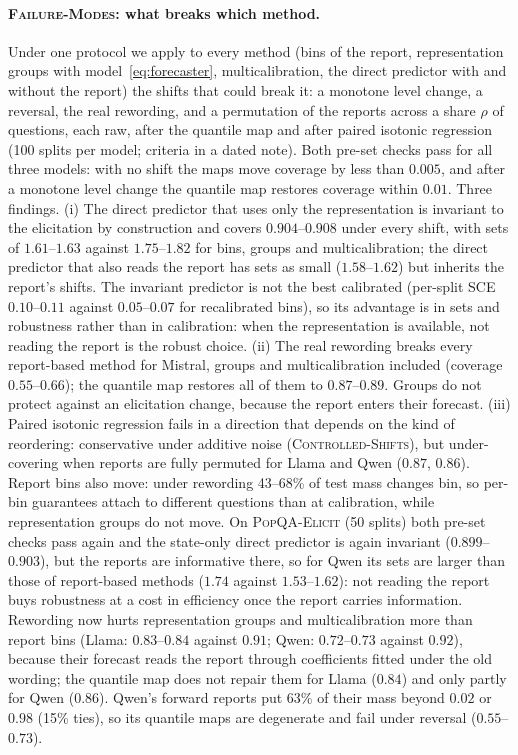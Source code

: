 \documentclass[twoside]{article}
\theoremstyle{definition}
\theoremstyle{remark}
\newcommand{\1}{\mathbf{1}}
\newcommand{\expname}[1]{\textsc{#1}}
\begin{document}
\paragraph{\expname{Failure-Modes}: what breaks which method.} Under one protocol we
apply to every method (bins of the report, representation groups with model~\eqref{eq:forecaster},
multicalibration, the direct predictor with and without the report) the shifts that could break it: a
monotone level change, a reversal, the real rewording, and a permutation of the reports across a share
$\rho$ of questions, each raw, after the quantile map and after paired isotonic regression (100 splits
per model; criteria in a dated note). Both pre-set checks pass for all three models: with no shift the
maps move coverage by less than $0.005$, and after a monotone level change the quantile map restores
coverage within $0.01$. Three findings. (i) The direct predictor that uses only the representation is
invariant to the elicitation by construction and covers $0.904$--$0.908$ under every shift, with sets of
$1.61$--$1.63$ against $1.75$--$1.82$ for bins, groups and multicalibration; the direct predictor that
also reads the report has sets as small ($1.58$--$1.62$) but inherits the report's shifts. The
invariant predictor is not the best calibrated (per-split SCE $0.10$--$0.11$ against $0.05$--$0.07$ for
recalibrated bins), so its advantage is in sets and robustness rather than in calibration: when the
representation is available, not reading the report is the robust choice. (ii) The real rewording
breaks every report-based method for Mistral, groups and multicalibration included (coverage
$0.55$--$0.66$); the quantile map restores all of them to $0.87$--$0.89$. Groups do not protect against
an elicitation change, because the report enters their forecast. (iii) Paired isotonic regression
fails in a direction that depends on the kind of reordering: conservative under additive noise
(\expname{Controlled-Shifts}), but under-covering when reports are fully permuted for Llama and Qwen
($0.87$, $0.86$). Report bins also move: under rewording 43--68\% of test mass changes bin, so per-bin
guarantees attach to different questions than at calibration, while representation groups do not move.
On \expname{PopQA-Elicit} (50 splits) both
pre-set checks pass again and the state-only direct predictor is again invariant ($0.899$--$0.903$), but
the reports are informative there, so for Qwen its sets are larger than those of report-based methods
($1.74$ against $1.53$--$1.62$): not reading the report buys robustness at a cost in efficiency once the
report carries information. Rewording now hurts representation groups and multicalibration more than
report bins (Llama: $0.83$--$0.84$ against $0.91$; Qwen: $0.72$--$0.73$ against $0.92$), because their forecast
reads the report through coefficients fitted under the old wording; the quantile map does not repair
them for Llama ($0.84$) and only partly for Qwen ($0.86$). Qwen's forward reports put 63\% of their mass beyond $0.02$ or $0.98$ (15\% ties), so its
quantile maps are degenerate and fail under reversal ($0.55$--$0.73$).
\end{document}
